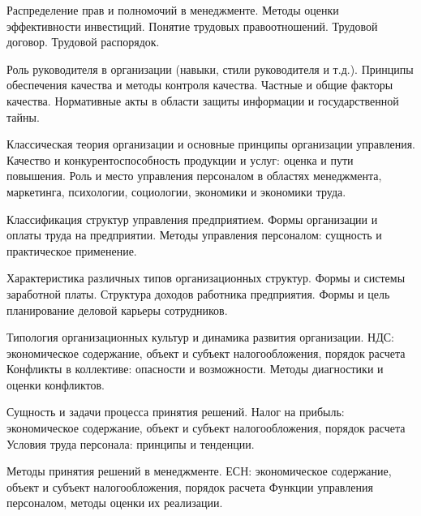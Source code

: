 \documentclass[
	11pt,
	a4paper,
	]
	{article}
\begin{document}
\bigskip

\noindent{} 
	{
		Распределение прав и полномочий в менеджменте.
	}{
		Методы оценки эффективности инвестиций.
	}{
		Понятие трудовых правоотношений. Трудовой договор. Трудовой распорядок.
	}

\bigskip

\noindent{} 
	{
		Роль руководителя в организации (навыки, стили руководителя и т.д.).
	}{
		Принципы обеспечения качества и методы контроля качества. Частные и общие факторы качества.
	}{
		Нормативные акты в области защиты информации и государственной тайны.
	}

\bigskip

\noindent{} 
	{
		Классическая теория организации и основные принципы организации управления.
	}{
		Качество и конкурентоспособность продукции и услуг: оценка и пути повышения.
	}{
		Роль и место управления персоналом в областях менеджмента, маркетинга, психологии, социологии, экономики и экономики труда.
	}

\bigskip

\noindent{} 
	{
		Классификация структур управления предприятием.
	}{
		Формы организации и оплаты труда на предприятии.
	}{
		Методы управления персоналом: сущность и практическое применение.
	}

\bigskip

\noindent{} 
	{
		Характеристика различных типов организационных структур.
	}{
		Формы и системы заработной платы. Структура доходов работника предприятия.
	}{
		Формы и цель планирование деловой карьеры сотрудников.
	}

\bigskip

\noindent{} 
	{
		Типология организационных культур и динамика развития организации.
	}{
		НДС: экономическое содержание, объект и субъект налогообложения, порядок расчета
	}{
		Конфликты в коллективе: опасности и возможности. Методы диагностики и оценки конфликтов.
	}

\bigskip

\noindent{} 
	{
		Сущность и задачи процесса принятия решений.
	}{
		Налог на прибыль: экономическое содержание, объект и субъект налогообложения, порядок расчета
	}{
		Условия труда персонала: принципы и тенденции.
	}

\bigskip

\noindent{} 
	{
		Методы принятия решений в менеджменте.
	}{
		ЕСН: экономическое содержание, объект и субъект налогообложения, порядок расчета
	}{
		Функции управления персоналом, методы оценки их реализации.
	}
\end{document}
